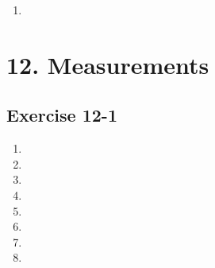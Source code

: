 \begin{enumerate}[itemsep=20pt, label=\textbf{\arabic*}.]
\begin{enumerate}[noitemsep, label=\textbf{(\alph*)} ]
\end{enumerate}


\item %

\end{enumerate}

\section {12. Measurements}
\subsection{Exercise 12-1} %

\begin{enumerate}[noitemsep, label=\textbf{\arabic*}. ] 
 \item
\item
\item
\item 
\item
\item
\item
\item 
\end{enumerate}
